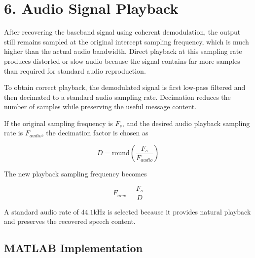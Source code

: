 \documentclass{article}
\begin{document}
\section*{6. Audio Signal Playback}

After recovering the baseband signal using coherent demodulation, the output still remains sampled at the original intercept sampling frequency, which is much higher than the actual audio bandwidth. Direct playback at this sampling rate produces distorted or slow audio because the signal contains far more samples than required for standard audio reproduction.

To obtain correct playback, the demodulated signal is first low-pass filtered and then decimated to a standard audio sampling rate. Decimation reduces the number of samples while preserving the useful message content.

If the original sampling frequency is $F_s$, and the desired audio playback sampling rate is $F_{audio}$, the decimation factor is chosen as

\begin{equation*}
D = \text{round}\left(\frac{F_s}{F_{audio}}\right)
\end{equation*}
\vspace{-0.3cm}

The new playback sampling frequency becomes

\begin{equation*}
F_{new} = \frac{F_s}{D}
\end{equation*}
\vspace{-0.3cm}

A standard audio rate of $44.1\text{kHz}$ is selected because it provides natural playback and preserves the recovered speech content.

\newpage
\subsection*{MATLAB Implementation}
\end{document}
